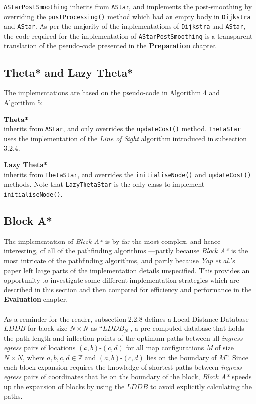 \documentclass[12pt,notitlepage]{report}
\begin{document}
{\tt AStarPostSmoothing} inherits from {\tt AStar}, and implements the post-smoothing by overriding the {\tt postProcessing()} method which had an empty body in {\tt Dijkstra} and {\tt AStar}. As per the majority of the implementations of {\tt Dijkstra} and {\tt AStar}, the code required for the implementation of {\tt AStarPostSmoothing} is a transparent translation of the pseudo-code presented in the {\bfseries Preparation} chapter.\\

\subsection {Theta* and Lazy Theta*}

The implementations are based on the pseudo-code in Algorithm 4 and Algorithm 5: 
\begin{description}
\item{\bfseries Theta*}\\ \hfill inherits from {\tt AStar}, and only overrides the {\tt updateCost()} method. {\tt ThetaStar} uses the implementation of the {\em Line of Sight} algorithm introduced in subsection 3.2.4.
\item {\bfseries Lazy Theta*}\\ \hfill inherits from {\tt ThetaStar}, and overrides the {\tt initialiseNode()} and {\tt updateCost()} methods. Note that {\tt LazyThetaStar} is the only class to implement {\tt initialiseNode()}.
\end{description}

\subsection {Block A*}
The implementation of {\em Block A*} is by far the most complex, and hence interesting, of all of the pathfinding algorithms ---partly because {\em Block A*} is the most intricate of the pathfinding algorithms, and partly because {\em Yap et al.}'s paper left large parts of the implementation details unspecified. This provides an opportunity to investigate some different implementation strategies which are described in this section and then compared for efficiency and performance in the {\bfseries Evaluation} chapter.\\

\\
\noindent
As a reminder for the reader, subsection 2.2.8 defines a Local Distance Database $LDDB$ for block size $N \times N$ as ``$LDDB_{N}$ , a pre-computed database that holds the path length and inflection points of the optimum paths between all {\em ingress-egress} pairs of locations $(a,b)$-$(c,d)$ for all map configurations $M$ of size $N \times N$, where $a,b,c,d \in \mathbb{Z}$ and $(a,b)$-$(c,d)$ lies on the boundary of $M$''. Since each block expansion requires the knowledge of shortest paths between {\em ingress-egress} pairs of coordinates that lie on the boundary of the block, {\em Block A*} speeds up the expansion of blocks by using the $LDDB$ to avoid explicitly calculating the paths.\\
\end{document}
